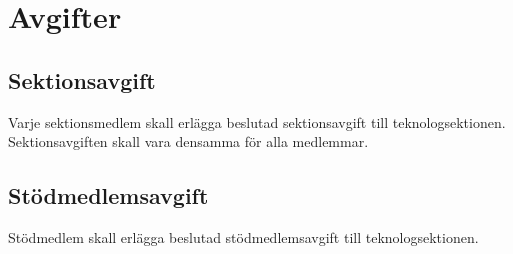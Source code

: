 \section{Avgifter}

\subsection{Sektionsavgift}
Varje sektionsmedlem skall erlägga beslutad sektionsavgift till teknologsektionen. Sektionsavgiften skall vara densamma för alla medlemmar.

\subsection{Stödmedlemsavgift}
\label{subsec:stodmedlemsavgift}
Stödmedlem skall erlägga beslutad stödmedlemsavgift till teknologsektionen.

